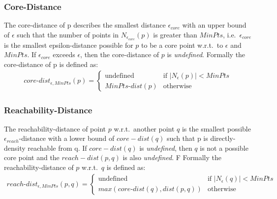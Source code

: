 \subsubsection*{Core-Distance}
The core-distance of p describes the smallest  distance $\epsilon_{core}$ with an upper bound of $\epsilon$ such that the number of points in $N_{\epsilon_{core}}(p)$ is greater than $MinPts$, i.e.\ $\epsilon_{core}$ is the smallest epsilon-distance possible for $p$ to be a core point w.r.t.\ to $\epsilon$ and $MinPts$. If $\epsilon_{core}$ exceeds $\epsilon$, then the core-distance of $p$ is \textit{undefined}. Formally the core-distance of p is defined as:
\begin{align}
    core\text{-}dist_{\epsilon,MinPts}(p)=
    \begin{cases}
        \text{undefined} &\text{if } |N_\epsilon(p)| < MinPts\\
        MinPts\text{-}dist(p) &\text{otherwise}
    \end{cases}
\end{align}

\subsubsection*{Reachability-Distance}
The reachability-distance of point $p$ w.r.t.\ another point $q$ is the smallest possible $\epsilon_{reach}$-distance with a lower bound of $core-dist(q)$ such that p is directly-density reachable from q. If $core-dist(q)$ is \textit{undefined}, then $q$ is not a possible core point and the $reach-dist(p,q)$ is also \textit{undefined}. F
Formally the reachability-distance of $p$ w.r.t.\ $q$ is defined as:
\begin{align}
    reach\text{-}dist_{\epsilon,MinPts}(p,q)=
    \begin{cases}
        \text{undefined} &\text{if } |N_\epsilon(q)| < MinPts\\
        max(core\text{-}dist(q), dist(p,q)) &\text{otherwise}
    \end{cases}
\end{align}

